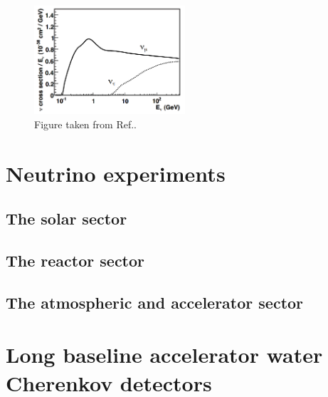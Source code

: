 \begin{figure} %
    \includegraphics[origin=c,width=0.5\textwidth]{diagrams/4-exp/tau_comparison.png}
    \caption[tau comparison short]
    {Figure taken from Ref.\cite{formaggio2012}.}
    \label{fig:tau_comparison}
\end{figure}

\section{Neutrino experiments} %
\label{sec:exp_exp} %

\subsection{The solar sector} %
\label{sec:exp_exp_solar} %

\subsection{The reactor sector} %
\label{sec:exp_exp_reactor} %

\subsection{The atmospheric and accelerator sector} %
\label{sec:exp_exp_atmospheric} %

\section{Long baseline accelerator water Cherenkov detectors} %
\label{sec:exp_long} %

